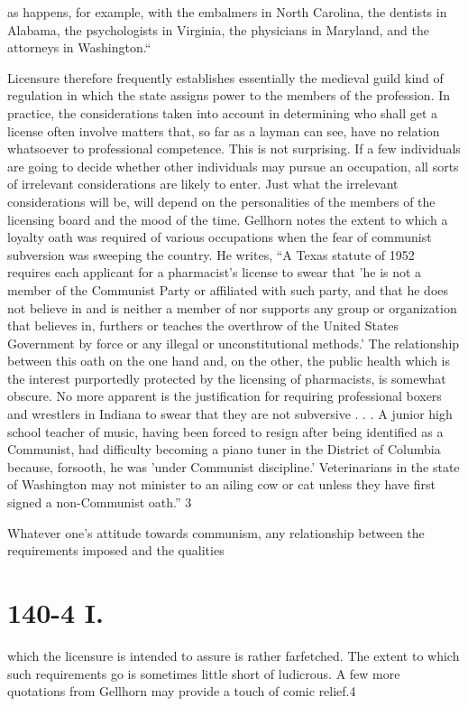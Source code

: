 \documentclass[11pt,openany]{book}
\newcommand{\booksection}[1]{%
  \phantomsection\section*{#1}%
  \addcontentsline{toc}{section}{#1}\markright{#1}}
\begin{document}
as happens, for example, with the embalmers in North Carolina, the dentists in Alabama, the psychologists in Virginia, the physicians in Maryland, and the attorneys in Washington.``

Licensure therefore frequently establishes essentially the medieval guild kind of regulation in which the state assigns power to the members of the profession. In practice, the considerations taken into account in determining who shall get a license often involve matters that, so far as a layman can see, have no relation whatsoever to professional competence. This is not surprising. If a few individuals are going to decide whether other individuals may pursue an occupation, all sorts of irrelevant considerations are likely to enter. Just what the irrelevant considerations will be, will depend on the personalities of the members of the licensing board and the mood of the time. Gellhorn notes the extent to which a loyalty oath was required of various occupations when the fear of communist subversion was sweeping the country. He writes, ``A Texas statute of 1952 requires each applicant for a pharmacist's license to swear that 'he is not a member of the Communist Party or affiliated with such party, and that he does not believe in and is neither a member of nor supports any group or organization that believes in, furthers or teaches the overthrow of the United States Government by force or any illegal or unconstitutional methods.' The relationship between this oath on the one hand and, on the other, the public health which is the interest purportedly protected by the licensing of pharmacists, is somewhat obscure. No more apparent is the justification for requiring professional boxers and wrestlers in Indiana to swear that they are not subversive . . . A junior high school teacher of music, having been forced to resign after being identified as a Communist, had difficulty becoming a piano tuner in the District of Columbia because, forsooth, he was 'under Communist discipline.' Veterinarians in the state of Washington may not minister to an ailing cow or cat unless they have first signed a non-Communist oath.'' 3

Whatever one's attitude towards communism, any relationship between the requirements imposed and the qualities

\booksection{140-4 I.}

which the licensure is intended to assure is rather farfetched. The extent to which such requirements go is sometimes little short of ludicrous. A few more quotations from Gellhorn may provide a touch of comic relief.4
\end{document}
